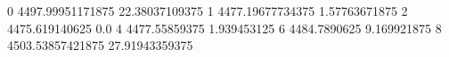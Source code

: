 0 4497.99951171875 22.38037109375
1 4477.19677734375 1.57763671875
2 4475.619140625 0.0
4 4477.55859375 1.939453125
6 4484.7890625 9.169921875
8 4503.53857421875 27.91943359375
